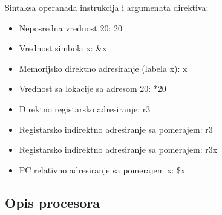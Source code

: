 \noindent Sintaksa operanada instrukcija i argumenata direktiva:
\begin{itemize}
    \item Neposredna vrednost 20: 20
    \item Vrednost simbola x: \&x
    \item Memorijsko direktno adresiranje (labela x): x
    \item Vrednost sa lokacije sa adresom 20: *20
    \item Direktno registarsko adresiranje: r3
    \item Registarsko indirektno adresiranje sa pomerajem: r3\rbrack
    \item Registarsko indirektno adresiranje sa pomerajem: r3\lbrack x\rbrack
    \item PC relativno adresiranje sa pomerajem x: \$x
\end{itemize}

\subsection{Opis procesora}

